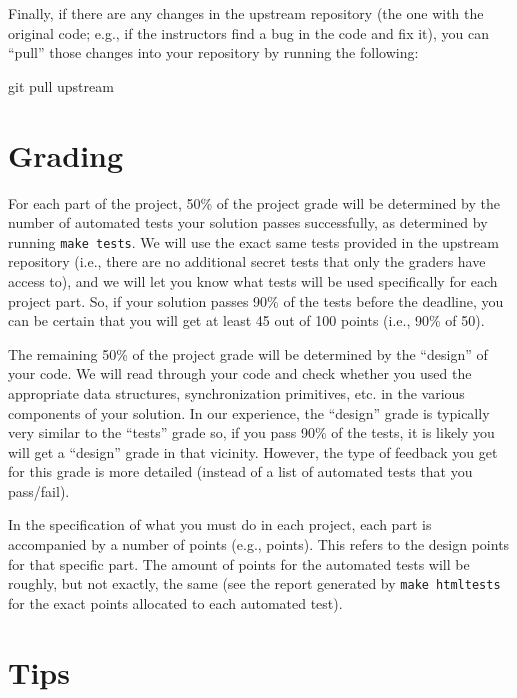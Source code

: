 \documentclass[10pt]{article}
\newcommand{\points}[1]{{\sffamily\mdseries\guillemotleft #1 points\guillemotright{}}}
\newenvironment{example}%
{\VerbatimEnvironment\begin{Sbox}\begin{VerbExample}}%
{\end{VerbExample}\end{Sbox}\setlength{\fboxsep}{8pt}\begin{center}\fcolorbox{black}{backgroundgray}{\TheSbox}\end{center}}
\begin{document}
Finally, if there are any changes in the upstream repository (the one with the original code; e.g., if the instructors find a bug in the code and fix it), you can ``pull'' those changes into your repository by running the following:

\begin{example}
git pull upstream
\end{example}

\pagebreak

\section{Grading}
\label{sec:grading}

For each part of the project, 50\% of the project grade will be determined by the number of automated tests your solution passes successfully, as determined by running \texttt{make tests}. We will use the exact same tests provided in the upstream repository (i.e., there are no additional secret tests that only the graders have access to), and we will let you know what tests will be used specifically for each project part. So, if your solution passes 90\% of the tests before the deadline, you can be certain that you will get at least 45 out of 100 points (i.e., 90\% of 50).

The remaining 50\% of the project grade will be determined by the ``design'' of your code. We will read through your code and check whether you used the appropriate data structures, synchronization primitives, etc. in the various components of your solution. In our experience, the ``design'' grade is typically very similar to the ``tests'' grade so, if you pass 90\% of the tests, it is likely you will get a ``design'' grade in that vicinity. However, the type of feedback you get for this grade is more detailed (instead of a list of automated tests that you pass/fail).

In the specification of what you must do in each project, each part is accompanied by a number of points (e.g., \points{10}). This refers to the design points for that specific part. The amount of points for the automated tests will be roughly, but not exactly, the same (see the report generated by \texttt{make htmltests} for the exact points allocated to each automated test).

\section{Tips}
\label{sec:tips}
\end{document}

